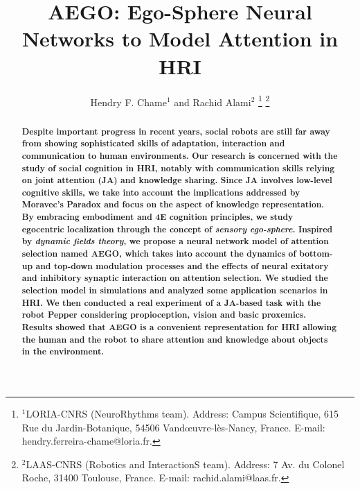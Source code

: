 \documentclass[letterpaper, 10 pt, conference]{ieeeconf}  %
\title{\LARGE \bf
	AEGO: Ego-Sphere Neural Networks to Model Attention in HRI
}
\author{Hendry F. Chame$^{1}$ and Rachid Alami$^{2}$%
	\thanks{$^{1}$LORIA-CNRS (NeuroRhythms team). Address: Campus Scientifique, 615 Rue du Jardin-Botanique, 54506 Vand\oe uvre-l\`es-Nancy, France.
		{\small E-mail: hendry.ferreira-chame@loria.fr}.}%
	\thanks{$^{2}$LAAS-CNRS (Robotics and InteractionS team). Address: 7 Av. du Colonel Roche, 31400 Toulouse, France.
		{\small E-mail: rachid.alami@laas.fr}.}%
}
\begin{document}
		
	
	\maketitle
	\thispagestyle{empty}
	\pagestyle{empty}
	
	
	\begin{abstract}
		
		
		\small \bf Despite important progress in recent years, social robots are still far away from showing sophisticated skills of adaptation, interaction and communication to human environments. Our research is concerned with the study of social cognition in HRI, notably with communication skills relying on joint attention (JA) and knowledge sharing. Since JA involves low-level cognitive skills, we take into account the implications addressed by Moravec's Paradox and focus on the aspect of knowledge representation. By embracing embodiment and 4E cognition principles, we study egocentric localization through the concept of \textit{sensory ego-sphere}. Inspired by \textit{dynamic fields theory}, we	propose a neural network model of attention selection named AEGO, which takes into account the dynamics of bottom-up and top-down modulation processes and the effects of neural exitatory and inhibitory synaptic interaction on attention selection. We studied the selection model in simulations and analyzed some application scenarios in HRI. We then conducted a real experiment of a JA-based task with the robot Pepper considering propioception, vision and basic proxemics. Results showed that AEGO is a convenient representation for HRI allowing the human and the robot to share attention and knowledge about objects in the environment.
		

\end{abstract}
\end{document}
